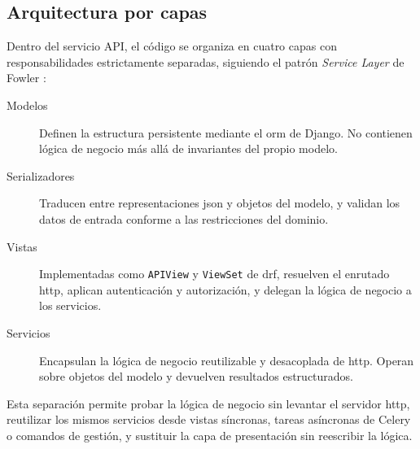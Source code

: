 \subsection{Arquitectura por capas}
\label{SS:DES-LAYERS}

Dentro del servicio API, el código se organiza en cuatro capas con
responsabilidades estrictamente separadas, siguiendo el patrón
\textit{Service Layer} de Fowler \cite{fowler2002}:

\begin{description}
  \item[Modelos] Definen la estructura persistente mediante el \acs{orm}
  de Django. No contienen lógica de negocio más allá de invariantes del
  propio modelo.

  \item[Serializadores] Traducen entre representaciones \acs{json} y
  objetos del modelo, y validan los datos de entrada conforme a las
  restricciones del dominio.

  \item[Vistas] Implementadas como \texttt{APIView} y \texttt{ViewSet} de
  \acs{drf}, resuelven el enrutado \acs{http}, aplican autenticación y
  autorización, y delegan la lógica de negocio a los servicios.

  \item[Servicios] Encapsulan la lógica de negocio reutilizable y
  desacoplada de \acs{http}. Operan sobre objetos del modelo y devuelven
  resultados estructurados.
\end{description}

Esta separación permite probar la lógica de negocio sin levantar el
servidor \acs{http}, reutilizar los mismos servicios desde vistas
síncronas, tareas asíncronas de Celery o comandos de gestión, y sustituir
la capa de presentación sin reescribir la lógica.
